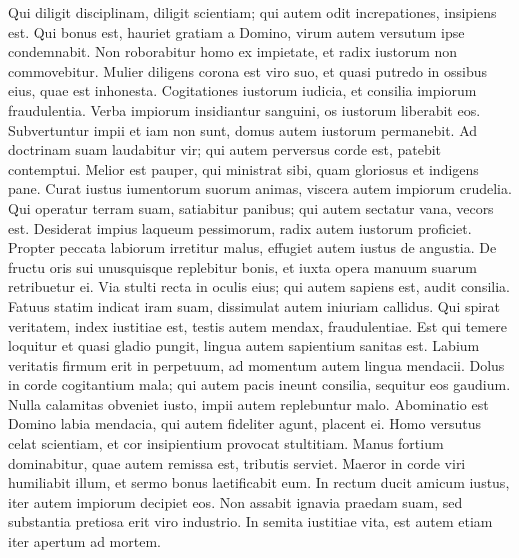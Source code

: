 \begin{biblechapter}
\begin{biblechapter}
\begin{biblechapter}
\begin{biblechapter}
\begin{biblechapter}
\begin{biblechapter}
\begin{biblechapter}
\begin{biblechapter}
\begin{biblechapter}
\begin{biblechapter}
\begin{biblechapter}
\begin{biblechapter}
 \verse Qui diligit disciplinam, diligit scientiam;
 qui autem odit increpationes, insipiens est.
 \verse Qui bonus est, hauriet gratiam a Domino,
 virum autem versutum ipse condemnabit.
 \verse Non roborabitur homo ex impietate,
 et radix iustorum non commovebitur.
 \verse Mulier diligens corona est viro suo,
 et quasi putredo in ossibus eius, quae est inhonesta.
 \verse Cogitationes iustorum iudicia,
 et consilia impiorum fraudulentia.
 \verse Verba impiorum insidiantur sanguini,
 os iustorum liberabit eos.
 \verse Subvertuntur impii et iam non sunt,
 domus autem iustorum permanebit.
 \verse Ad doctrinam suam laudabitur vir;
 qui autem perversus corde est, patebit contemptui.
 \verse Melior est pauper, qui ministrat sibi,
 quam gloriosus et indigens pane.
 \verse Curat iustus iumentorum suorum animas,
 viscera autem impiorum crudelia.
 \verse Qui operatur terram suam, satiabitur panibus;
 qui autem sectatur vana, vecors est.
 \verse Desiderat impius laqueum pessimorum,
 radix autem iustorum proficiet.
 \verse Propter peccata labiorum irretitur malus,
 effugiet autem iustus de angustia.
 \verse De fructu oris sui unusquisque replebitur bonis,
 et iuxta opera manuum suarum retribuetur ei.
 \verse Via stulti recta in oculis eius;
 qui autem sapiens est, audit consilia.
 \verse Fatuus statim indicat iram suam,
 dissimulat autem iniuriam callidus.
 \verse Qui spirat veritatem, index iustitiae est,
 testis autem mendax, fraudulentiae.
 \verse Est qui temere loquitur et quasi gladio pungit,
 lingua autem sapientium sanitas est.
 \verse Labium veritatis firmum erit in perpetuum,
 ad momentum autem lingua mendacii.
 \verse Dolus in corde cogitantium mala;
 qui autem pacis ineunt consilia, sequitur eos gaudium.
 \verse Nulla calamitas obveniet iusto,
 impii autem replebuntur malo.
 \verse Abominatio est Domino labia mendacia,
 qui autem fideliter agunt, placent ei.
 \verse Homo versutus celat scientiam,
 et cor insipientium provocat stultitiam.
 \verse Manus fortium dominabitur,
 quae autem remissa est, tributis serviet.
 \verse Maeror in corde viri humiliabit illum,
 et sermo bonus laetificabit eum.
 \verse In rectum ducit amicum iustus,
 iter autem impiorum decipiet eos.
 \verse Non assabit ignavia praedam suam,
 sed substantia pretiosa erit viro industrio.
 \verse In semita iustitiae vita,
 est autem etiam iter apertum ad mortem.
 

\end{biblechapter}
\end{biblechapter}
\end{biblechapter}
\end{biblechapter}
\end{biblechapter}
\end{biblechapter}
\end{biblechapter}
\end{biblechapter}
\end{biblechapter}
\end{biblechapter}
\end{biblechapter}
\end{biblechapter}
